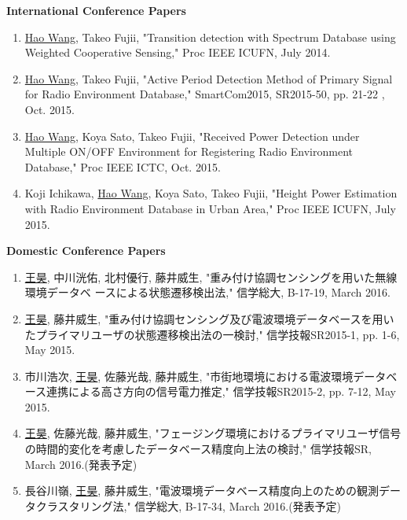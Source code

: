 \begin{publication}
{\bf International Conference Papers}
  \begin{enumerate}[{}i{.}]
  
      \item \underline{Hao Wang}, Takeo Fujii, "Transition detection with Spectrum Database using Weighted Cooperative Sensing," Proc IEEE ICUFN, July 2014.
 
      \item \underline{Hao Wang}, Takeo Fujii, "Active Period Detection Method of Primary Signal for Radio Environment Database," SmartCom2015, SR2015-50, pp. 21-22 , Oct. 2015.
      \item \underline{Hao Wang}, Koya Sato, Takeo Fujii, "Received Power Detection under Multiple ON/OFF Environment for Registering Radio Environment Database," Proc IEEE ICTC, Oct. 2015.
 
      \item Koji Ichikawa, \underline{Hao Wang}, Koya Sato, Takeo Fujii, "Height Power Estimation with Radio Environment Database in Urban Area," Proc IEEE ICUFN, July 2015.
   \end{enumerate}
{\bf Domestic Conference Papers}
    \begin{enumerate}[{}i{.}]
        \item \underline{王昊}, 中川洸佑, 北村優行, 藤井威生, "重み付け協調センシングを用いた無線環境データベ ースによる状態遷移検出法," 信学総大, B-17-19, March 2016.
         \item \underline{王昊}, 藤井威生, "重み付け協調センシング及び電波環境データベースを用いたプライマリユーザの状態遷移検出法の一検討," 信学技報SR2015-1, pp. 1-6, May 2015.
         \item 市川浩次, \underline{王昊}, 佐藤光哉, 藤井威生, "市街地環境における電波環境データベース連携による高さ方向の信号電力推定," 信学技報SR2015-2, pp. 7-12, May 2015.
         \item \underline{王昊}, 佐藤光哉, 藤井威生, "フェージング環境におけるプライマリユーザ信号の時間的変化を考慮したデータベース精度向上法の検討," 信学技報SR, March 2016.(発表予定)
         \item 長谷川嶺, \underline{王昊}, 藤井威生, "電波環境データベース精度向上のための観測データクラスタリング法," 信学総大, B-17-34, March 2016.(発表予定)
    \end{enumerate}

\end{publication}
